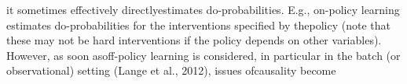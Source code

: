 it sometimes effectively directlyestimates do-probabilities.  E.g., on-policy learning estimates do-probabilities for the interventions specified by thepolicy (note that these may not be hard interventions if the policy depends on other variables). However, as soon asoff-policy learning is considered, in particular in the batch (or observational) setting (Lange et al., 2012), issues ofcausality become